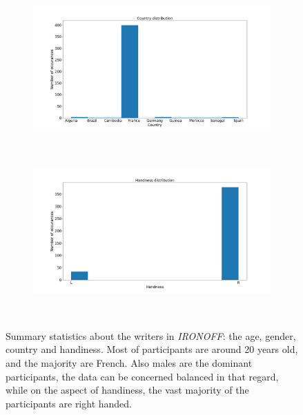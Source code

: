\begin{figure}
\begin{subfigure}{0.45\textwidth}
        \includegraphics[scale=0.25]{images/dataset/country.png}
    \end{subfigure}
    ~
    \begin{subfigure}{0.45\textwidth}
        \includegraphics[scale=0.25]{images/dataset/handness_dist.png}
    \end{subfigure}
    ~
    \caption{Summary statistics about the writers in \textit{IRONOFF}: the age, gender, country and handiness. Most of participants are around 20 years old, and the majority are French. Also males are the dominant participants, the data can be concerned balanced in that regard, while on the aspect of handiness, the vast majority of the participants are right handed.}
    \label{fig:ironoff_basic_stats}
\end{figure}


